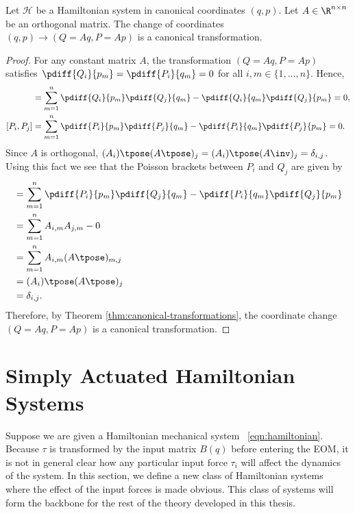 \begin{lemma}\label{lemma:linear-is-canonical}
    Let \(\mathcal{H}\) be a Hamiltonian system in canonical coordinates
    \((q,p)\).
    Let \(A \in \R^{n\times n}\) be an orthogonal matrix.
    The change of coordinates \((q,p) \to (Q = Aq, P = Ap)\) is a canonical
    transformation.
\end{lemma}
\begin{proof}
    For any constant matrix \(A\), the transformation
    \((Q = Aq, P = Ap)\) satisfies
    \(\pdiff{Q_i}{p_m} = \pdiff{P_i}{q_m} = 0\) for all 
    \(i,m \in \{1,\ldots,n\}\).
    Hence, 
    \begin{align*}
        [Q_i,Q_j] &= \sum\limits_{m = 1}^n \pdiff{Q_i}{p_m}\pdiff{Q_j}{q_m} - 
        \pdiff{Q_i}{q_m}\pdiff{Q_j}{p_m} = 0
        , \\
        [P_i,P_j] &= \sum\limits_{m=1}^n \pdiff{P_i}{p_m}\pdiff{P_j}{q_m} -
        \pdiff{P_i}{q_m}\pdiff{P_j}{p_m} = 0
        .
    \end{align*}
    Since \(A\) is orthogonal, 
    \((A_i)\tpose (A\tpose)_j = (A_i)\tpose (A\inv)_j = \delta_{i,j}\). 
    Using this fact we see that the Poisson brackets between \(P_i\) and \(Q_j\)
    are given by
    \begin{align*}
        [P_i,Q_j] &= \sum\limits_{m=1}^n\pdiff{P_i}{p_m}\pdiff{Q_j}{q_m}
        - \pdiff{P_i}{q_m}\pdiff{Q_j}{p_m} \\
                  &= \sum\limits_{m=1}^n A_{i,m}A_{j,m} - 0 \\
                  &= \sum\limits_{m=1}^n A_{i,m}(A\tpose)_{m,j} \\
                  &= (A_i)\tpose (A\tpose)_j \\
                  &= \delta_{i,j}
        .
    \end{align*}
    Therefore, by Theorem \ref{thm:canonical-transformations}, the coordinate
    change \((Q = Aq, P = Ap)\) is a canonical transformation.
\end{proof}

\section{Simply Actuated Hamiltonian Systems}\label{sec:simply-actuated}
Suppose we are given a Hamiltonian mechanical system ~\eqref{eqn:hamiltonian}.
Because \(\tau\) is transformed by the input matrix \(B(q)\) before
entering the EOM, it is not in general clear how any particular input force \(\tau_i\)
will affect the dynamics of the system. 
In this section, we define a new class of Hamiltonian systems where the effect
of the input forces is made obvious. This class of
systems will form the backbone for the rest of the theory developed in this
thesis.

